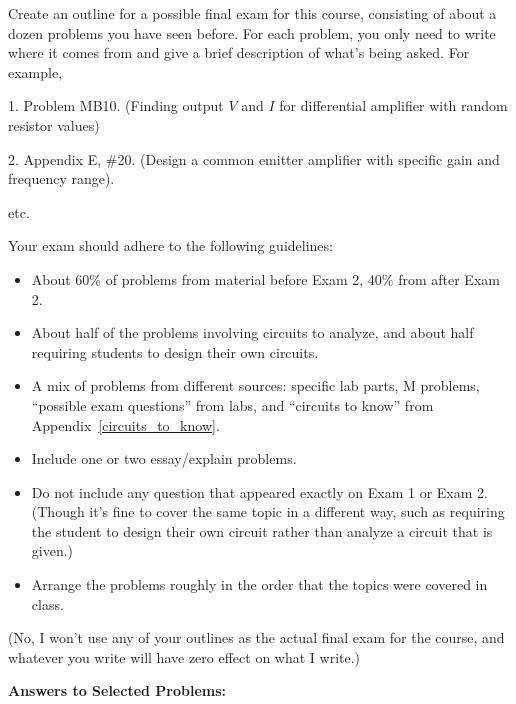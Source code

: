 \begin{Exercise}
Create an outline for a possible final exam for this course, consisting of about a dozen problems you have seen before.  For each problem, you only need to write where it comes from and give a brief description of what's being asked.  For example,

\begin{description}[labelindent=0.25in, leftmargin=0.5in, nosep]
\item 1. Problem MB10.  (Finding output $V$ and $I$ for differential amplifier with random resistor values)
\item 2. Appendix E, \#20. (Design a common emitter amplifier with specific gain and frequency range).
\item etc.
\end{description}
Your exam should adhere to the following guidelines:
\begin{itemize}[nosep]
\item About 60\% of problems from material before Exam 2, 40\% from after Exam 2.
\item About half of the problems involving circuits to analyze, and about half requiring students to design their own circuits.
\item A mix of problems from different sources: specific lab parts, M problems,  ``possible exam questions'' from labs, and ``circuits to know'' from Appendix~\ref{circuits_to_know}. 
\item Include one or two essay/explain problems.
\item Do not include any question that appeared exactly on Exam 1 or Exam 2.  (Though it's fine to cover the same topic in a different way, such as requiring the student to design their own circuit rather than analyze a circuit that is given.)
\item Arrange the problems roughly in the order that the topics were covered in class.
\end{itemize}
(No, I won't use any of your outlines as the actual final exam for the course, and whatever you write will have zero effect on what I write.)
\end{Exercise}


\vspace{0.7in}

\textbf{Answers to Selected {\thesubsection} Problems:}
\label{applications_prob_answers}
\shipoutAnswer

\cleardoublepage
